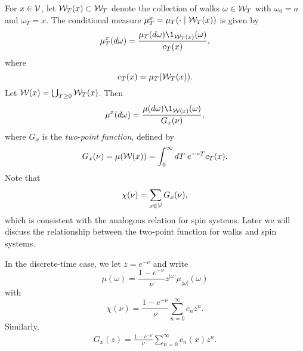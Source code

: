 For $x \in \mathcal{V}$, let $\mathcal{W}_T(x) \subset \mathcal{W}_T$ denote the collection of walks $\omega \in \mathcal{W}_T$ with $\omega_0 = a$ and $\omega_T = x$. The conditional measure $\mu^x_T = \mu_T(\cdot \mid \mathcal{W}_T(x))$ is given by
\begin{equation}
\mu^x_T(d\omega) = \frac{\mu_T(d\omega) \1_{\Wcal_T(x)}(\omega)}{c_T(x)},
\end{equation}
where
\begin{equation}
c_T(x) = \mu_T(\mathcal{W}_T(x)).
\end{equation}
Let $\mathcal{W}(x) = \bigcup_{T \ge 0} \mathcal{W}_T(x)$. Then
\begin{equation}
\mu^x(d\omega) = \frac{\mu(d\omega) \1_{\Wcal(x)}(\omega)}{G_x(\nu)},
\end{equation}
where $G_x$ is the \emph{two-point function}, defined by
\begin{equation}
G_x(\nu) = \mu(\mathcal{W}(x)) = \int_0^\infty dT \; e^{-\nu T} c_T(x).
\end{equation}
Note that
\begin{equation}
\chi(\nu) = \sum_{x\in\mathcal{V}} G_x(\nu),
\end{equation}
which is consistent with the analogous relation for spin systems. Later we will discuss the relationship between the two-point function for walks and spin systems.


\begin{rk}
In the discrete-time case, we let $z = e^{-\nu}$ and write
\begin{equation}
\mu(\omega)
  =
\frac{1 - e^{-\nu}}{\nu} z^{|\omega|} \mu_{|\omega|}(\omega)
\end{equation}
with
\begin{equation}
\chi(\nu) = \frac{1 - e^{-\nu}}{\nu} \sum_{n=0}^\infty c_n z^n.
\end{equation}
Similarly,
\begin{align}
G_x(z) = \frac{1 - e^{-\nu}}{\nu} \sum_{n=0}^\infty c_n(x) z^n.
\end{align}
\end{rk}

